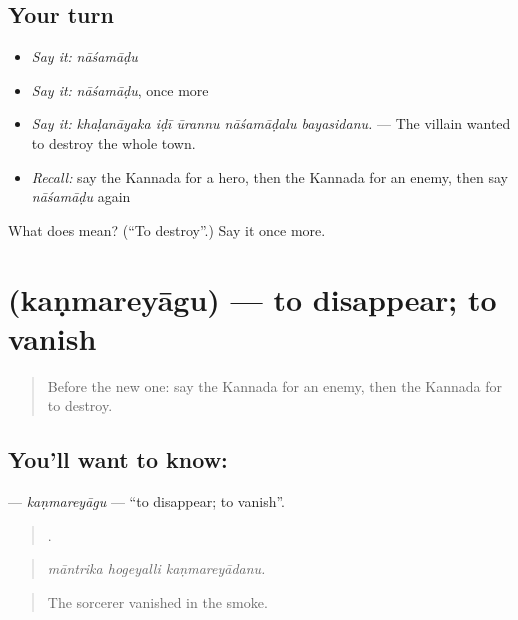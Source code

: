 \subsection*{Your turn}
\begin{itemize}
\raggedright
  \item \emph{Say it:} \emph{nāśamāḍu}
  \item \emph{Say it:} \emph{nāśamāḍu}, once more
  \item \emph{Say it:} \emph{khaḷanāyaka iḍī ūrannu nāśamāḍalu bayasidanu.} — The villain wanted to destroy the whole town.
  \item \emph{Recall:} say the Kannada for a hero, then the Kannada for an enemy, then say \emph{nāśamāḍu} again
\end{itemize}

\begin{tcolorbox}[breakable,colback=teal!4,colframe=teal!35!black,title={Before you move on}]
What does  mean? (\textquotedblleft{}To destroy\textquotedblright{}.) Say it once more.
\end{tcolorbox}
\section[\texorpdfstring{\kn{ಕಣ್ಮರೆಯಾಗು} (kaṇmareyāgu)}{ಕಣ್ಮರೆಯಾಗು (kaṇmareyāgu)}]{ (kaṇmareyāgu) — to disappear; to vanish}

\label{lesson:KA-C367-kanmareyagu}



\begin{quote}
Before the new one: say the Kannada for an enemy, then the Kannada for to destroy.
\end{quote}

\subsection*{You'll want to know: }
\textbf{} — \emph{kaṇmareyāgu} — \textquotedblleft{}to disappear; to vanish\textquotedblright{}.

\begin{quote}
  .
\end{quote}

\begin{quote}
\emph{māntrika hogeyalli kaṇmareyādanu.}
\end{quote}

\begin{quote}
The sorcerer vanished in the smoke.
\end{quote}

